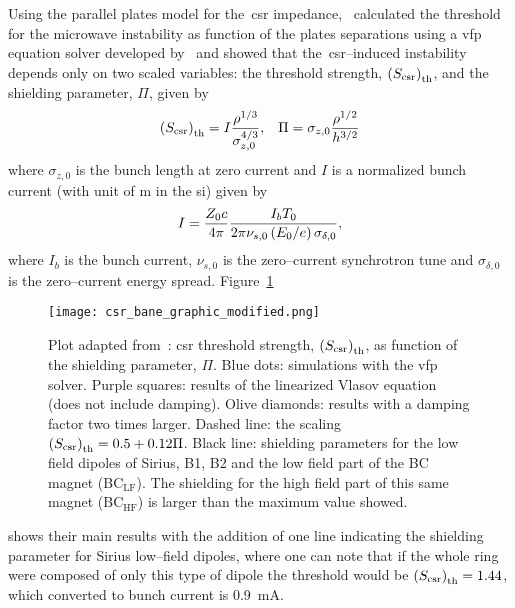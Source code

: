     \def \Scsr {\fof{S_\text{csr}}_\text{th}}
    Using the parallel plates model for the~\gls{csr} impedance,~ calculated the threshold for the microwave instability as function of the plates separations using a \gls{vfp} equation solver developed by~ and showed that the~\gls{csr}--induced instability depends only on two scaled variables: the threshold strength, $\Scsr$, and the shielding parameter, $\Pi$, given by
    \begin{align}\label{eq:csr_shielding_strength}
        \Scsr = I\frac{\rho^{1/3}}{\sigma_{z,0}^{4/3}}, & &  \Pi = \sigma_{z,0}\frac{\rho^{1/2}}{h^{3/2}}
    \end{align}
    where $\sigma_{z,0}$ is the bunch length at zero current and $I$ is a normalized bunch current (with unit of \si{\meter} in the \gls{si}) given by
    \begin{align}\label{eq:normalized_current}
        I = \frac{Z_0c}{4\pi}\frac{I_bT_0}{2\pi\nu_{s,0}\left(E_0/e\right)\sigma_{\delta,0}},
    \end{align}
    where $I_b$ is the bunch current, $\nu_{s,0}$ is the zero--current synchrotron tune and $\sigma_{\delta,0}$ is the zero--current energy spread. Figure~\ref{fig:csr_bane_graphic_modified}
    \begin{figure}
        \centering
        \texttt{[image: csr\_bane\_graphic\_modified.png]}
        \caption[CSR driven longitudinal instability (adapted from~).]{Plot adapted from~: \gls{csr} threshold strength, $\Scsr$, as function of the shielding parameter, $\Pi$. Blue dots: simulations with the \gls{vfp} solver. Purple squares: results of the linearized Vlasov equation (does not include damping). Olive diamonds: results with a damping factor two times larger. Dashed line: the scaling $\Scsr = 0.5 + 0.12\Pi$. Black line: shielding parameters for the low field dipoles of Sirius, B1, B2 and the low field part of the BC magnet (BC$_\text{LF}$). The shielding for the high field part of this same magnet (BC$_\text{HF}$) is larger than the maximum value showed.}
        \label{fig:csr_bane_graphic_modified}
    \end{figure}
    shows their main results with the addition of one line indicating the shielding parameter for Sirius low--field dipoles, where one can note that if the whole ring were composed of only this type of dipole the threshold would be $\Scsr=1.44$, which converted to bunch current is \SI{0.9}{\milli\ampere}.

